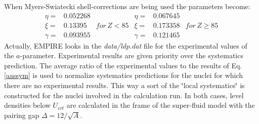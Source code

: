 \documentclass[twocolumn,amsmath,amssymb,10pt,groupedaddress,a4paper]{revtex4}
\begin{document}
When Myers-Swiatecki shell-corrections are being used the parameters
become:\begin{equation}
\begin{array}{ccc}
\eta= & 0.052268\\
\xi= & 0.13395 & for\, Z<85\\
\gamma= & 0.093955\end{array}\begin{array}{ccc}
\eta= & 0.067645\\
\xi= & 0.173358 & for\, Z\geq85\\
\gamma= & 0.121465\end{array}\end{equation}
Actually, EMPIRE looks in the \emph{data/ldp.dat} file for the experimental
values of the $a$-parameter. Experimental results are given priority
over the systematics prediction. The average ratio of the experimental
values to the results of Eq. \ref{aassym} is used to normalize systematics
predictions for the nuclei for which there are no experimental results.
This way a sort of the \char`\"{}local systematics\char`\"{} is constructed
for the nuclei involved in the calculation run. In both cases, level
densities below $U_{crt}$ are calculated
in the frame of the super-fluid model \cite{igna} with the pairing
gap $\Delta=12/\sqrt{A}$.
\end{document}
